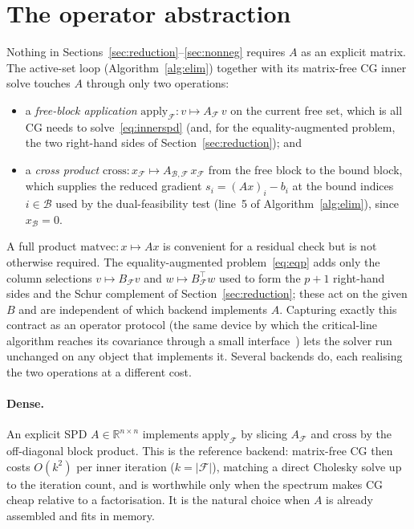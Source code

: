 \section{The operator abstraction}\label{sec:operators}

Nothing in Sections~\ref{sec:reduction}--\ref{sec:nonneg} requires $A$ as an explicit
matrix. The active-set loop (Algorithm~\ref{alg:elim}) together with its matrix-free CG
inner solve touches $A$ through only two operations:
\begin{itemize}
  \item a \emph{free-block application} $\mathrm{apply}_{\mathcal{F}}\colon v \mapsto
  A_{\mathcal{F}}\,v$ on the current free set, which is all CG needs to
  solve~\eqref{eq:innerspd} (and, for the equality-augmented problem, the two right-hand
  sides of Section~\ref{sec:reduction}); and
  \item a \emph{cross product} $\mathrm{cross}\colon x_{\mathcal{F}} \mapsto
  A_{\mathcal{B},\mathcal{F}}\,x_{\mathcal{F}}$ from the free block to the bound block, which
  supplies the reduced gradient $s_i = (Ax)_i - b_i$ at the bound indices $i \in \mathcal{B}$
  used by the dual-feasibility test (line~5 of Algorithm~\ref{alg:elim}), since
  $x_{\mathcal{B}} = 0$.
\end{itemize}
A full product $\mathrm{matvec}\colon x \mapsto Ax$ is convenient for a residual check but is
not otherwise required. The equality-augmented problem~\eqref{eq:eqp} adds only the column
selections $v \mapsto B_{\mathcal{F}}v$ and $w \mapsto B_{\mathcal{F}}^\top w$ used to form the
$p+1$ right-hand sides and the Schur complement of Section~\ref{sec:reduction}; these act on
the given $B$ and are independent of which backend implements $A$. Capturing exactly this contract as an operator protocol (the same
device by which the critical-line algorithm reaches its covariance through a small
interface~\cite{schmelzer2026cla,cvxcla}) lets the solver run unchanged on any object that
implements it. Several backends do, each realising the two operations at a different cost.

\paragraph{Dense.}
An explicit SPD $A \in \mathbb{R}^{n\times n}$ implements $\mathrm{apply}_{\mathcal{F}}$ by
slicing $A_{\mathcal{F}}$ and $\mathrm{cross}$ by the off-diagonal block product. This is the
reference backend: matrix-free CG then costs $O(k^2)$ per inner iteration ($k = |\mathcal{F}|$),
matching a direct Cholesky solve up to the iteration count, and is worthwhile only when the
spectrum makes CG cheap relative to a factorisation. It is the natural choice when $A$ is
already assembled and fits in memory.

